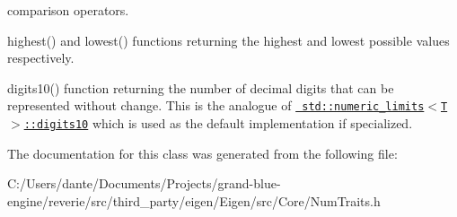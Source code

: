 \begin{DoxyItemize}
comparison operators. \item highest() and lowest() functions returning the highest and lowest possible values respectively. \item digits10() function returning the number of decimal digits that can be represented without change. This is the analogue of \href{http://en.cppreference.com/w/cpp/types/numeric_limits/digits10}{\texttt{ std\+::numeric\+\_\+limits$<$\+T$>$\+::digits10}} which is used as the default implementation if specialized. \end{DoxyItemize}


The documentation for this class was generated from the following file\+:\begin{DoxyCompactItemize}
\item 
C\+:/\+Users/dante/\+Documents/\+Projects/grand-\/blue-\/engine/reverie/src/third\+\_\+party/eigen/\+Eigen/src/\+Core/Num\+Traits.\+h\end{DoxyCompactItemize}
